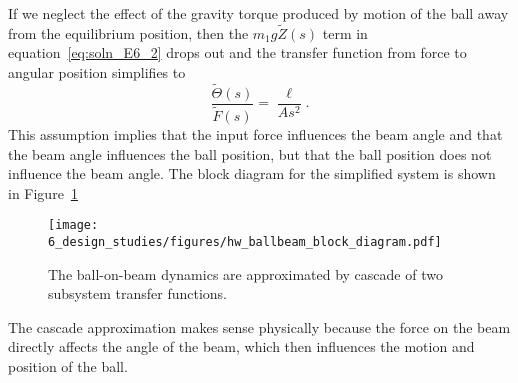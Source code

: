 If we neglect the effect of the gravity torque produced by motion of the ball away from the equilibrium position, then the $m_1 g \tilde{Z}(s)$ term in equation~\eqref{eq:soln_E6_2} drops out and the transfer function from force to angular position simplifies to 
\[
     \frac{\tilde{\Theta}(s)}{\tilde{F}(s)} = \frac{\ell}{As^2} .
\]
This assumption implies that the input force influences the beam angle and that the beam angle influences the ball position, but that the ball position does not influence the beam angle.
%
The block diagram for the simplified system is shown in Figure~\ref{fig:hw_ballbeam_block_diagram}
\begin{figure}[htbp]
   \centering
   \texttt{[image: 6\_design\_studies/figures/hw\_ballbeam\_block\_diagram.pdf]}
   \caption{The ball-on-beam dynamics are approximated by cascade of two subsystem transfer functions.}
   \label{fig:hw_ballbeam_block_diagram} 
\end{figure}

The cascade approximation makes sense physically because the force on the beam directly affects the angle of the beam, which then influences the motion and position of the ball.
